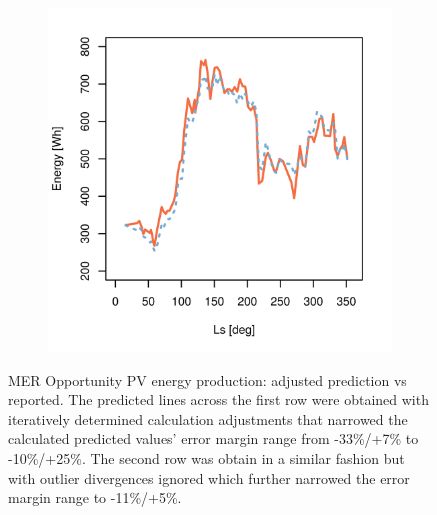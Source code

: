 \begin{figure}[h]
\begin{subfigure}[t]{\subfigureWidth}
		\label{fig:plot:sub:mer-energy-production-predicted-vs-reported-my30-adjusted-without-outliers}
	\end{subfigure}\hfill
    \begin{subfigure}[t]{\subfigureWidth}
        \centering
		\includegraphics[height=\graphicsHeight]{sections/appendix/B/plots/predicted-vs-measured-energy-my32-adjusted-without-outliers.png}
		\label{fig:plot:sub:mer-energy-production-predicted-vs-reported-my32-adjusted-without-outliers}
	\end{subfigure}
    \caption[\ac{MER} Opportunity \ac{PV} energy production: adjusted prediction vs reported]
            {\ac{MER} Opportunity \ac{PV} energy production: adjusted prediction vs reported. The predicted lines across the first row were obtained with iteratively determined calculation adjustments that narrowed the calculated predicted values' error margin range from -33\%/+7\% to -10\%/+25\%. The second row was obtain in a similar fashion but with outlier divergences ignored which further narrowed the error margin range to -11\%/+5\%.}
    \label{fig:plot:mer-energy-production-predicted-vs-reported-adjusted-with-and-without-outliers}
\vspace{-2ex}
\end{figure}
